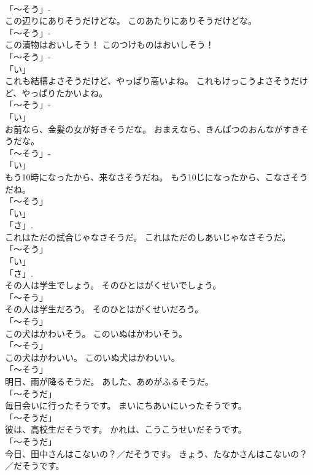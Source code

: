 \documentclass[8pt]{extreport}
\begin{document}
\begin{CJK}{UTF8}{min}
\\	「～そう」- 
\\	この辺りにありそうだけどな。	このあたりにありそうだけどな。	
\\	「～そう」- 
\\	この漬物はおいしそう！	このつけものはおいしそう！	
\\	「～そう」- 
\\	「い」 
\\	これも結構よさそうだけど、やっぱり高いよね。	これもけっこうよさそうだけど、やっぱりたかいよね。	
\\	「～そう」- 
\\	「い」 
\\	お前なら、金髪の女が好きそうだな。	おまえなら、きんぱつのおんながすきそうだな。	
\\	「～そう」- 
\\	「い」 
\\	もう10時になったから、来なさそうだね。	もう10じになったから、こなさそうだね。	
\\	「～そう」 
\\	「い」 
\\	「さ」.	
\\	これはただの試合じゃなさそうだ。	これはただのしあいじゃなさそうだ。	
\\	「～そう」 
\\	「い」 
\\	「さ」.	
\\	その人は学生でしょう。	そのひとはがくせいでしょう。	
\\	「～そう」 
\\	その人は学生だろう。	そのひとはがくせいだろう。	
\\	「～そう」 
\\	この犬はかわいそう。	このいぬはかわいそう。	
\\	「～そう」 
\\	この犬はかわいい。	このいぬ犬はかわいい。	
\\	「～そう」 
\\	明日、雨が降るそうだ。	あした、あめがふるそうだ。	
\\	「～そうだ」	
\\	毎日会いに行ったそうです。	まいにちあいにいったそうです。	
\\	「～そうだ」	
\\	彼は、高校生だそうです。	かれは、こうこうせいだそうです。	
\\	「～そうだ」	
\\	今日、田中さんはこないの？／だそうです。	きょう、たなかさんはこないの？／だそうです。	

\end{CJK}
\end{document}
